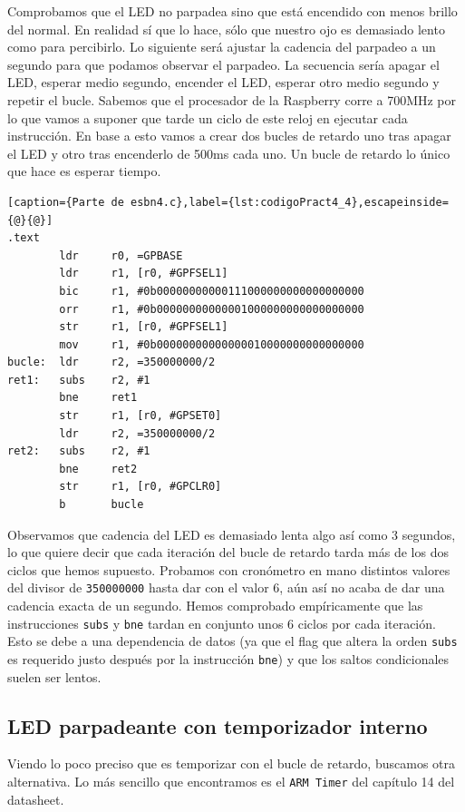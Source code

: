 Comprobamos que el LED no parpadea sino que está encendido con menos brillo del normal.
En realidad sí que lo hace, sólo que nuestro ojo es demasiado lento como para percibirlo.
Lo siguiente será ajustar la cadencia del parpadeo a un segundo para que podamos observar
el parpadeo. La secuencia sería apagar el LED, esperar medio segundo, encender el LED,
esperar otro medio segundo y repetir el bucle. Sabemos que el procesador de la Raspberry
corre a 700MHz por lo que vamos a suponer que tarde un ciclo de este reloj en ejecutar
cada instrucción. En base a esto vamos a crear dos bucles de retardo uno tras apagar el LED
y otro tras encenderlo de 500ms cada uno. Un bucle de retardo lo único que hace es esperar
tiempo. 

\begin{lstlisting}[caption={Parte de esbn4.c},label={lst:codigoPract4_4},escapeinside={@}{@}]
.text
        ldr     r0, =GPBASE
        ldr     r1, [r0, #GPFSEL1]
        bic     r1, #0b00000000000111000000000000000000
        orr     r1, #0b00000000000001000000000000000000
        str     r1, [r0, #GPFSEL1]
        mov     r1, #0b00000000000000010000000000000000
bucle:  ldr     r2, =350000000/2
ret1:   subs    r2, #1
        bne     ret1
        str     r1, [r0, #GPSET0]
        ldr     r2, =350000000/2
ret2:   subs    r2, #1
        bne     ret2
        str     r1, [r0, #GPCLR0]
        b       bucle
\end{lstlisting}

Observamos que cadencia del LED es demasiado lenta algo así como 3 segundos, lo que quiere
decir que cada iteración del bucle de retardo tarda más de los dos ciclos que hemos supuesto.
Probamos con cronómetro en mano distintos valores del divisor de {\tt 350000000} hasta dar con
el valor 6, aún así no acaba de dar una cadencia exacta de un segundo. Hemos comprobado
empíricamente que las instrucciones {\tt subs} y {\tt bne} tardan en conjunto unos 6 ciclos
por cada iteración. Esto se debe a una dependencia de datos (ya que el flag que altera
la orden {\tt subs} es requerido justo después por la instrucción {\tt bne}) y que los saltos
condicionales suelen ser lentos.

\subsection{LED parpadeante con temporizador interno}

Viendo lo poco preciso que es temporizar con el bucle de retardo, buscamos otra alternativa.
Lo más sencillo que encontramos es el {\tt ARM Timer} del capítulo 14 del datasheet.

